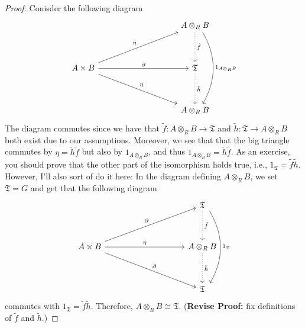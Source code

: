 \documentclass[12pt,reqno]{amsart}
\theoremstyle{plain}
\begin{document}
\begin{proof}
Conisder the following diagram
$$\begin{tikzcd}
                                                            &  &  &  & A \otimes_R B \arrow[dd, "\tilde{f}", dotted] \arrow[dddd, "1_{A \otimes_R B}", bend left, shift left=2] \\
                                                            &  &  &  &                                                                      \\
A \times B \arrow[rrrr, "\partial"] \arrow[rrrruu, "\eta"] \arrow[rrrrdd, "\eta"] &  &  &  & \mathfrak{T} \arrow[dd, "\tilde{h}", dotted]                                            \\
                                                            &  &  &  &                                                                      \\
                                                            &  &  &  & A \otimes_R B                                                                   
\end{tikzcd}$$ 
The diagram commutes since we have that $\tilde{f} \colon A \otimes_R B \to \mathfrak{T}$ and $\tilde{h} \colon \mathfrak{T} \to A \otimes_R B$ both exist due to our assumptions. Moreover, we see that that the big triangle commutes by $\eta = \tilde{h} \tilde{f}$ but also by $1_{A \otimes_R B}$, and thus $1_{A \otimes_R B} = \tilde{h} \tilde{f}$. As an exercise, you should prove that the other part of the isomorphism holds true, i.e., $1_{\mathfrak{T}} = \tilde{f} \tilde{h}$. However, I'll also sort of do it here: In the diagram defining $A \otimes_R B$, we set $\mathfrak{T} = G$ and get that the following diagram 
$$\begin{tikzcd}
                                                            &  &  &  & \mathfrak{T} \arrow[dd, "\tilde{f}", dotted] \arrow[dddd, "1_{\mathfrak{T}}", bend left, shift left=2] \\
                                                            &  &  &  &                                                                      \\
A \times B \arrow[rrrr, "\eta"] \arrow[rrrruu, "\partial"] \arrow[rrrrdd, "\partial"] &  &  &  & A \otimes_R B \arrow[dd, "\tilde{h}", dotted]                                            \\
                                                            &  &  &  &                                                                      \\
                                                            &  &  &  & \mathfrak{T}
\end{tikzcd}$$ commutes with $1_{\mathfrak{T}} = \tilde{f} \tilde{h}$. Therefore, $A \otimes_R B \cong \mathfrak{T}$. (\textbf{Revise Proof:} fix definitions of $\tilde{f}$ and $\tilde{h}$.)
\end{proof} 
\newpage 
\end{document}

